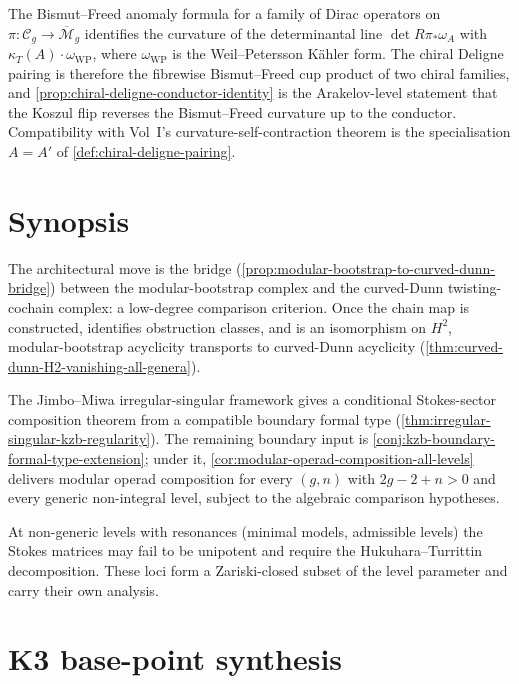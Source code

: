\begin{remark}
\label{rem:chiral-deligne-bismut-freed}
The Bismut--Freed anomaly formula for a family of Dirac
operators on \(\pi : \mathcal{C}_{g} \to
\overline{\mathcal{M}}_{g}\) identifies the curvature of the
determinantal line \(\det R\pi_{*}\omega_{A}\) with
\(\kappa_{T}(A) \cdot \omega_{\mathrm{WP}}\), where
\(\omega_{\mathrm{WP}}\) is the Weil--Petersson K\"ahler form.
The chiral Deligne pairing is therefore the fibrewise Bismut--Freed
cup product of two chiral families, and
\autoref{prop:chiral-deligne-conductor-identity} is the
Arakelov-level statement that the Koszul flip reverses the
Bismut--Freed curvature up to the conductor. Compatibility with
Vol~I's curvature-self-contraction theorem is the specialisation $A = A'$ of
\autoref{def:chiral-deligne-pairing}.
\end{remark}

\section*{Synopsis}

The architectural move is the bridge
(\autoref{prop:modular-bootstrap-to-curved-dunn-bridge}) between
the modular-bootstrap complex and the curved-Dunn twisting-cochain
complex: a low-degree comparison criterion. Once the chain map is
constructed, identifies obstruction classes, and is an isomorphism
on \(H^{2}\), modular-bootstrap acyclicity transports to
curved-Dunn acyclicity
(\autoref{thm:curved-dunn-H2-vanishing-all-genera}).

The Jimbo--Miwa irregular-singular framework gives a conditional
Stokes-sector composition theorem from a compatible boundary
formal type (\autoref{thm:irregular-singular-kzb-regularity}). The
remaining boundary input is
\autoref{conj:kzb-boundary-formal-type-extension}; under it,
\autoref{cor:modular-operad-composition-all-levels} delivers
modular operad composition for every \((g, n)\) with
\(2g - 2 + n > 0\) and every generic non-integral level, subject
to the algebraic comparison hypotheses.

At non-generic levels with resonances (minimal models, admissible
levels) the Stokes matrices may fail to be unipotent and require
the Hukuhara--Turrittin decomposition. These loci form a
Zariski-closed subset of the level parameter and carry their own
analysis.

\section{K3 base-point synthesis}
\label{sec:cdhg-supplement}


